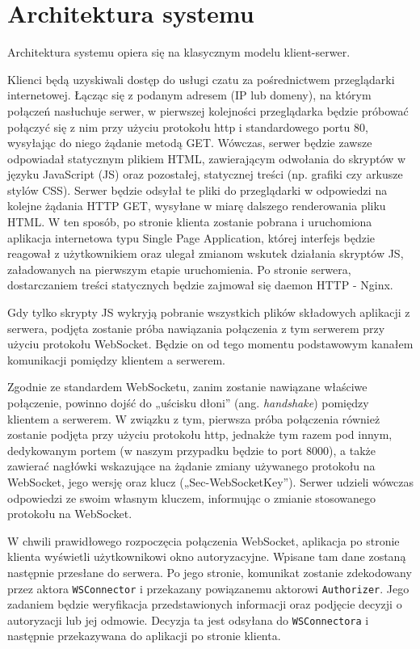\section{Architektura systemu}
\label{chat_architektura_systemu}

Architektura systemu opiera się na klasycznym modelu klient-serwer.

Klienci będą uzyskiwali dostęp do usługi czatu za pośrednictwem przeglądarki
internetowej. Łącząc się z podanym adresem (IP lub domeny), na którym połączeń
nasłuchuje serwer, w pierwszej kolejności przeglądarka będzie próbować połączyć
się z nim przy użyciu protokołu http i standardowego portu 80, wysyłając do
niego żądanie metodą GET. Wówczas, serwer będzie zawsze odpowiadał statycznym
plikiem HTML, zawierającym odwołania do skryptów w języku JavaScript (JS) oraz
pozostałej, statycznej treści (np. grafiki czy arkusze stylów CSS). Serwer
będzie odsyłał te pliki do przeglądarki w odpowiedzi na kolejne żądania HTTP
GET, wysyłane w miarę dalszego renderowania pliku HTML. W ten sposób, po
stronie klienta zostanie pobrana i uruchomiona aplikacja internetowa typu
Single Page
Application, której interfejs będzie reagował z użytkownikiem oraz ulegał
zmianom wskutek działania skryptów JS, załadowanych na pierwszym etapie
uruchomienia. Po stronie serwera, dostarczaniem treści statycznych będzie
zajmował się daemon HTTP - Nginx.

Gdy tylko skrypty JS wykryją pobranie wszystkich plików składowych aplikacji
z serwera, podjęta zostanie próba nawiązania połączenia z tym serwerem przy
użyciu protokołu WebSocket. Będzie on od tego momentu podstawowym kanałem
komunikacji pomiędzy klientem a serwerem.

Zgodnie ze standardem WebSocketu, zanim zostanie nawiązane właściwe połączenie,
powinno dojść do „uścisku dłoni” (ang. \textit{handshake}) pomiędzy klientem a
serwerem. W związku z tym, pierwsza próba połączenia również zostanie podjęta
przy użyciu protokołu http, jednakże tym razem pod innym, dedykowanym portem
(w naszym przypadku będzie to port 8000), a także zawierać nagłówki wskazujące
na żądanie zmiany używanego protokołu na WebSocket, jego wersję oraz klucz
(„Sec-WebSocketKey”). Serwer udzieli wówczas odpowiedzi ze swoim własnym
kluczem, informując o zmianie stosowanego protokołu na WebSocket.

W chwili prawidłowego rozpoczęcia połączenia WebSocket, aplikacja po stronie
klienta wyświetli użytkownikowi okno autoryzacyjne. Wpisane tam dane zostaną
następnie przesłane do serwera. Po jego stronie, komunikat zostanie zdekodowany
przez aktora \texttt{WSConnector} i przekazany powiązanemu aktorowi
\texttt{Authorizer}. Jego zadaniem będzie weryfikacja przedstawionych informacji
oraz podjęcie decyzji o autoryzacji lub jej odmowie. Decyzja ta jest odsyłana do
\texttt{WSConnectora} i następnie przekazywana do aplikacji po stronie klienta.


